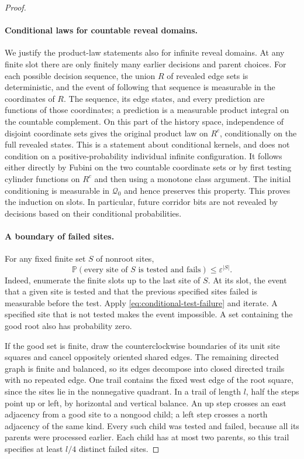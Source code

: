 \documentclass[11pt]{article}
\theoremstyle{definition}
\newcommand{\PP}{\mathbb P}
\begin{document}
\begin{proof}
\paragraph{Conditional laws for countable reveal domains.}
We justify the product-law statements also for infinite reveal
domains. At any finite slot there are only finitely many earlier
decisions and parent choices. For each possible decision sequence,
the union $R$ of revealed edge sets is deterministic, and the event
of following that sequence is measurable in the coordinates of $R$.
The sequence, its edge states, and every prediction are functions
of those coordinates; a prediction is a measurable product integral
on the countable complement. On this part of the history space,
independence of disjoint coordinate sets gives the original product
law on $R^c$, conditionally on the full revealed states. This is a
statement about conditional kernels, and does not condition on a
positive-probability individual infinite configuration. It follows
either directly by Fubini on the two countable coordinate sets or by
first testing cylinder functions on $R^c$ and then using a monotone
class argument. The initial conditioning is measurable in
$\mathcal Q_0$ and hence preserves this property. This proves the
induction on slots. In particular, future corridor bits are not
revealed by decisions based on their conditional probabilities.

\paragraph{A boundary of failed sites.}
For any fixed finite set $S$ of nonroot sites,
\begin{equation}\label{eq:specified-failures}
 \PP(\text{every site of }S\text{ is tested and fails})
       \le\varepsilon^{|S|}.
\end{equation}
Indeed, enumerate the finite slots up to the last site of $S$.
At its slot, the event that a given site is tested and that the
previous specified sites failed is measurable before the test.
Apply \eqref{eq:conditional-test-failure} and iterate. A specified
site that is not tested makes the event impossible. A set containing
the good root also has probability zero.

If the good set is finite, draw the counterclockwise boundaries of
its unit site squares and cancel oppositely oriented shared edges.
The remaining directed graph is finite and balanced, so its edges
decompose into closed directed trails with no repeated edge. One
trail contains the fixed west edge of the root square, since the
sites lie in the nonnegative quadrant. In a trail of length $l$,
half the steps point up or left, by horizontal and vertical balance.
An up step crosses an east adjacency from a good site to a nongood
child; a left step crosses a north adjacency of the same kind.
Every such child was tested and failed, because all its parents were
processed earlier. Each child has at most two parents, so this trail
specifies at least $l/4$ distinct failed sites.


\end{proof}
\end{document}
